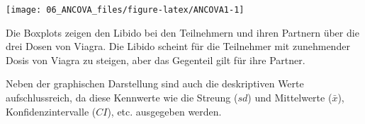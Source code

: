 \documentclass[]{article}
\newenvironment{Shaded}{\begin{snugshade}}{\end{snugshade}}
\newcommand{\CommentTok}[1]{\textcolor[rgb]{0.56,0.35,0.01}{\textit{#1}}}
\newcommand{\DataTypeTok}[1]{\textcolor[rgb]{0.13,0.29,0.53}{#1}}
\newcommand{\KeywordTok}[1]{\textcolor[rgb]{0.13,0.29,0.53}{\textbf{#1}}}
\newcommand{\NormalTok}[1]{#1}
\newcommand{\OperatorTok}[1]{\textcolor[rgb]{0.81,0.36,0.00}{\textbf{#1}}}
\newcommand{\OtherTok}[1]{\textcolor[rgb]{0.56,0.35,0.01}{#1}}
\newcommand{\StringTok}[1]{\textcolor[rgb]{0.31,0.60,0.02}{#1}}
\begin{document}
\begin{center}\texttt{[image: 06\_ANCOVA\_files/figure-latex/ANCOVA1-1]} \end{center}

Die Boxplots zeigen den Libido bei den Teilnehmern und ihren Partnern über die drei Dosen von Viagra. Die Libido scheint für die Teilnehmer mit zunehmender Dosis von Viagra zu steigen, aber das Gegenteil gilt für ihre Partner.

Neben der graphischen Darstellung sind auch die deskriptiven Werte aufschlussreich, da diese Kennwerte wie die Streung (\(sd\)) und Mittelwerte (\(\bar{x}\)), Konfidenzintervalle (\(CI\)), etc. ausgegeben werden.

\begin{Shaded}
\end{Shaded}
\end{document}
